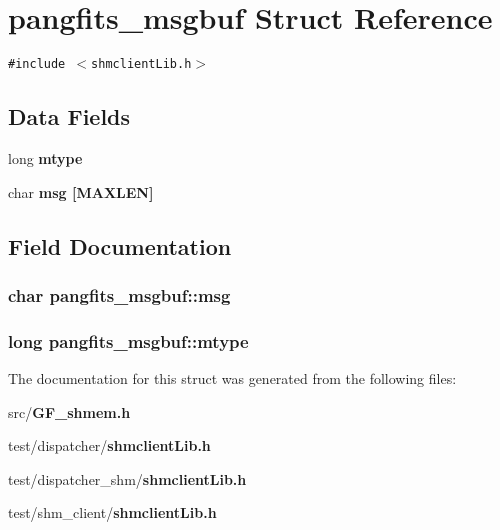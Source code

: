 \section{pangfits\_\-msgbuf Struct Reference}
\label{structpangfits__msgbuf}
{\tt \#include $<$shmclient\-Lib.h$>$}

\subsection*{Data Fields}
\begin{CompactItemize}
\item 
long \bf{mtype}
\item 
char \bf{msg} [MAXLEN]
\end{CompactItemize}


\subsection{Field Documentation}
\subsubsection{\setlength{\rightskip}{0pt plus 5cm}char \bf{pangfits\_\-msgbuf::msg}}\label{structpangfits__msgbuf_1037cbac365ec4db84932ec06534b81a}


\subsubsection{\setlength{\rightskip}{0pt plus 5cm}long \bf{pangfits\_\-msgbuf::mtype}}\label{structpangfits__msgbuf_dee0e0a3569eac5f18b8eb9e716238e6}




The documentation for this struct was generated from the following files:\begin{CompactItemize}
\item 
src/\bf{GF\_\-shmem.h}\item 
test/dispatcher/\bf{shmclient\-Lib.h}\item 
test/dispatcher\_\-shm/\bf{shmclient\-Lib.h}\item 
test/shm\_\-client/\bf{shmclient\-Lib.h}\end{CompactItemize}
